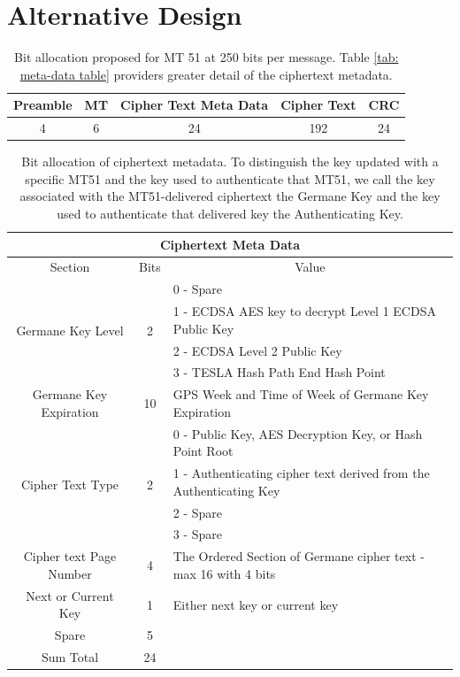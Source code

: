 \documentclass[letterpaper,times]{IONconf/IONconf}
\begin{document}
\section*{Alternative Design}

\begin{table}[H]
\center
\begin{tabular}{|c|c|c|c|c|} \hline
	Preamble & MT & Cipher Text Meta Data & Cipher Text & CRC \\ \hline
	4 & 6 & 24 & 192 & 24 \\ \hline
\end{tabular}
\caption{Bit allocation proposed for MT 51 at 250 bits per message. Table \ref{tab: meta-data table} providers greater detail of the ciphertext metadata.}
\label{tab: high-level table1}
\end{table}

\begin{table}[H]
\center
\begin{tabular}{|c|c|l|} \hline
	\multicolumn{3}{|c|}{Ciphertext Meta Data} \\ \hline
	Section & Bits & \multicolumn{1}{|c|}{Value} \\ \hline
	\multirow{4}{*}{Germane Key Level} & \multirow{4}{*}{2} & 0 - Spare \\ 
	& & 1 - ECDSA AES key to decrypt Level 1 ECDSA Public Key \\
	& & 2 - ECDSA Level 2 Public Key \\
	& & 3 - TESLA Hash Path End Hash Point \\ \hline
	Germane Key Expiration & 10 & GPS Week and Time of Week of Germane Key Expiration \\ \hline
	\multirow{4}{*}{Cipher Text Type} & \multirow{4}{*}{2} & 0 - Public Key, AES Decryption Key, or Hash Point Root \\
	& & 1 - Authenticating cipher text derived from the Authenticating Key \\ 
	& & 2 - Spare \\ 
	& & 3 - Spare \\ \hline
	Cipher text Page Number & 4 & The Ordered Section of Germane cipher text - max 16 with 4 bits\\ \hline
	Next or Current Key & 1 & Either next key or current key \\ \hline
	Spare & 5 & \\ \hline
	Sum Total & 24 & \\ \hline
\end{tabular}
\caption{Bit allocation of ciphertext metadata. To distinguish the key updated with a specific MT51 and the key used to authenticate that MT51, we call the key associated with the MT51-delivered ciphertext the Germane Key and the key used to authenticate that delivered key the Authenticating Key.}
\label{tab: meta-data table1}
\end{table}



\end{document}
